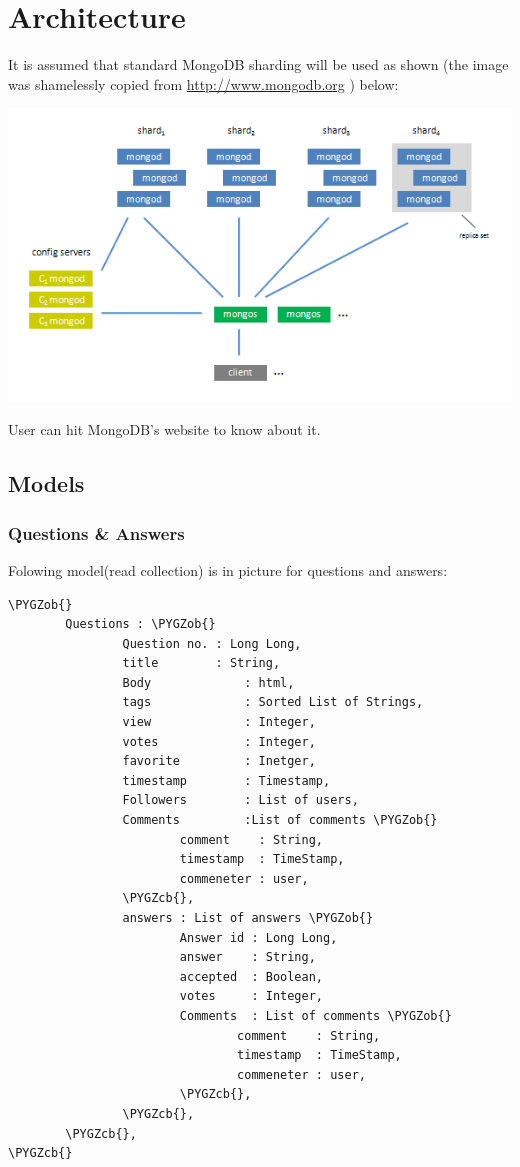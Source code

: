 \documentclass[letterpaper,10pt,english]{sphinxmanual}
\def\PYGZob{\char`\{}
\def\PYGZcb{\char`\}}
\begin{document}
\chapter{Architecture}
\label{arch::doc}\label{arch:architecture}
It is assumed that standard MongoDB sharding will be used as shown (the
image was shamelessly copied from \href{http://www.mongodb.org}{http://www.mongodb.org} ) below:

{\hfill\includegraphics{sharding.PNG}\hfill}

User can hit MongoDB's website to know about it.


\section{Models}
\label{arch:models}

\subsection{Questions \& Answers}
\label{arch:questions-answers}
Folowing model(read collection) is in picture for questions and answers:

\begin{Verbatim}[commandchars=\\\{\}]
\PYGZob{}
        Questions : \PYGZob{}
                Question no. : Long Long,
                title        : String,
                Body             : html,
                tags             : Sorted List of Strings,
                view             : Integer,
                votes            : Integer,
                favorite         : Inetger,
                timestamp        : Timestamp,
                Followers        : List of users,
                Comments         :List of comments \PYGZob{}
                        comment    : String,
                        timestamp  : TimeStamp,
                        commeneter : user,
                \PYGZcb{},
                answers : List of answers \PYGZob{}
                        Answer id : Long Long,
                        answer    : String,
                        accepted  : Boolean,
                        votes     : Integer,
                        Comments  : List of comments \PYGZob{}
                                comment    : String,
                                timestamp  : TimeStamp,
                                commeneter : user,
                        \PYGZcb{},
                \PYGZcb{},
        \PYGZcb{},
\PYGZcb{}
\end{Verbatim}
\end{document}
